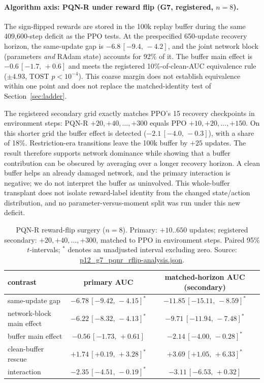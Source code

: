 \documentclass[10pt]{article} %
\newcommand{\sig}{^{\ast}}
\newcommand{\ci}[2]{\,[#1,\,#2]}
\begin{document}
\paragraph{Algorithm axis: PQN-R under reward flip (G7, registered, $n=8$).}
The sign-flipped rewards are stored in the 100k replay buffer during the same 409{,}600-step deficit as the PPO tests. At the prespecified 650-update recovery horizon, the same-update gap is $-6.8\ci{-9.4}{-4.2}$, and the joint network block (parameters \emph{and} RAdam state) accounts for 92\% of it. The buffer main effect is $-0.6\ci{-1.7}{+0.6}$ and meets the registered 10\%-of-clean-AUC equivalence rule ($\pm4.93$, TOST $p<10^{-4}$). This coarse margin does not establish equivalence within one point and does not replace the matched-identity test of Section~\ref{sec:ladder}.

The registered secondary grid exactly matches PPO's 15 recovery checkpoints in environment steps: PQN-R $+20,+40,\ldots,+300$ equals PPO $+10,+20,\ldots,+150$. On this shorter grid the buffer effect is detected ($-2.1\ci{-4.0}{-0.3}$), with a share of 18\%. Restriction-era transitions leave the 100k buffer by $+25$ updates. The result therefore supports network dominance while showing that a buffer contribution can be obscured by averaging over a longer recovery horizon. A clean buffer helps an already damaged network, and the primary interaction is negative; we do not interpret the buffer as uninvolved. This whole-buffer transplant does not isolate reward-label identity from the changed state/action distribution, and no parameter-versus-moment split was run under this new deficit.

\begin{table}[t]
\centering
\caption{PQN-R reward-flip surgery ($n=8$). Primary: $+10..650$ updates; registered secondary: $+20,+40,\ldots,+300$, matched to PPO in environment steps. Paired 95\% $t$-intervals; $\sig$ denotes an unadjusted interval excluding zero. Source: \url{p12_g7_pqnr_rflip-analysis.json}.}
\label{tab:p12pqnr}
\small
\begin{tabular}{lcc}
\toprule
contrast & primary AUC & matched-horizon AUC (secondary) \\
\midrule
same-update gap & $-6.78\ci{-9.42}{-4.15}\sig$ & $-11.85\ci{-15.11}{-8.59}\sig$ \\
network-block main effect & $-6.22\ci{-8.32}{-4.13}\sig$ & $-9.71\ci{-11.94}{-7.48}\sig$ \\
buffer main effect & $-0.56\ci{-1.73}{+0.61}$ & $-2.14\ci{-4.00}{-0.28}\sig$ \\
clean-buffer rescue & $+1.74\ci{+0.19}{+3.28}\sig$ & $+3.69\ci{+1.05}{+6.33}\sig$ \\
interaction & $-2.35\ci{-4.51}{-0.19}\sig$ & $-3.11\ci{-6.53}{+0.32}$ \\
\bottomrule
\end{tabular}
\end{table}
\end{document}
